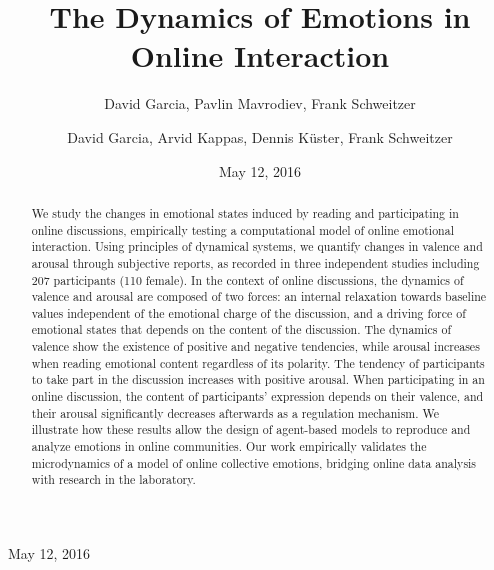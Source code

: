 \documentclass[nologo,url,11pt,a4paper]{ETHpaper}
\begin{document}
\title{The Dynamics of Emotions in Online Interaction}



\author{David Garcia, Pavlin Mavrodiev, Frank  Schweitzer}


\author{David Garcia, Arvid Kappas, Dennis K\"uster, Frank Schweitzer}

\address{Chair of Systems Design, ETH  Zurich, Weinbergstrasse 56/58, 8092 Zurich,  Switzerland \\
 Jacobs University Bremen,  Campus Ring 1, 28759 Bremen, Germany\\
 dgarcia@ethz.ch }

\date{May 12, 2016}


\maketitle
\centerline{May 12, 2016}

\begin{abstract}
We study the changes in emotional states induced by reading and participating in online discussions, empirically testing a computational model of online emotional interaction. 
Using principles of dynamical systems, we quantify changes in valence and arousal through subjective reports, as recorded in three independent studies including 207 participants (110 female). 
In the context of online discussions, the dynamics of valence and arousal are composed of two forces: an internal relaxation towards baseline values independent of the emotional charge of the discussion,  and  a driving force of emotional states that depends on the content of the discussion. 
The dynamics of valence show the existence of positive and negative tendencies, while arousal increases when reading emotional content regardless of its polarity. 
The tendency of participants to take part in the discussion increases with positive arousal.
When participating in an online discussion, the content of participants' expression depends on their valence,
and their arousal  significantly decreases afterwards as a regulation mechanism. 
We illustrate how these results allow the design of agent-based models  to reproduce and analyze emotions in online communities.
Our work empirically validates the microdynamics of a model of online collective emotions, bridging online data analysis  with  research in the laboratory.
\end{abstract}
\end{document}
